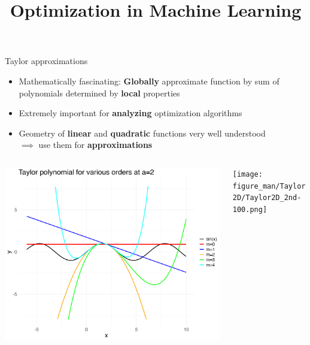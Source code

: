 \documentclass[11pt,compress,t,notes=noshow, xcolor=table]{beamer}
\title{Optimization in Machine Learning}
\begin{document}


\begin{vbframe}{Taylor approximations}

\begin{itemize}
    \item Mathematically fascinating: \textbf{Globally} approximate function by sum of polynomials determined by \textbf{local} properties
    \item Extremely important for \textbf{analyzing} optimization algorithms
    \item Geometry of \textbf{linear} and \textbf{quadratic} functions very well understood \\ $\implies$ use them for \textbf{approximations}
\end{itemize}

\begin{columns}
\begin{column}{0.45\textwidth}
\includegraphics[width=\columnwidth]{figure_man/taylor_univariate.png}
\end{column}
\begin{column}{0.55\textwidth}
\texttt{[image: figure\_man/Taylor2D/Taylor2D\_2nd-100.png]}
\end{column}
\end{columns}


\end{vbframe}
\end{document}
